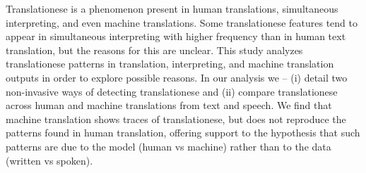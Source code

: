 Translationese is  a phenomenon  present  in human translations, simultaneous interpreting, and  even  machine  translations.  Some  translationese  features  tend  to  appear in simultaneous interpreting with higher frequency than in human text translation, but the reasons for this  are  unclear.   This  study analyzes  translationese  patterns  in  translation,  interpreting, and  machine  translation  outputs in order  to explore possible reasons.  In our analysis we -- (i)  detail  two  non-invasive  ways  of detecting translationese and (ii) compare translationese across  human  and  machine  translations  from text and speech.  We find that machine translation shows traces of translationese, but does not  reproduce the  patterns  found  in  human translation, offering support to the hypothesis that such patterns are due to the model (human vs machine) rather than to the data (written vs spoken).
